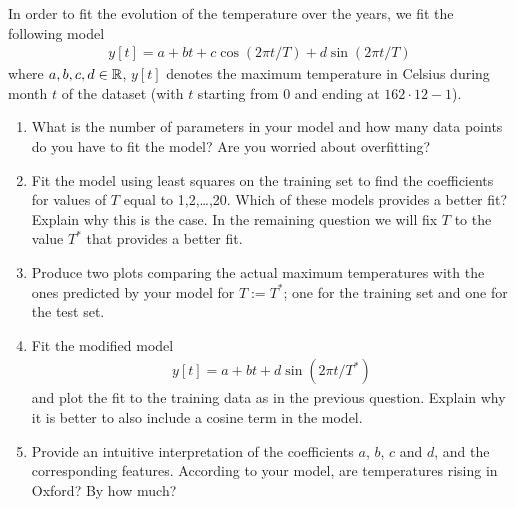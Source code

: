 \documentclass[12pt,twoside]{article}
\begin{document}
\begin{enumerate}
 In order to fit the evolution of the temperature over the years, we fit the following model
  \begin{align}
  y[t] = a + bt + c \cos(2\pi t/T) + d\sin(2\pi  t/T)
  \end{align}
  where $a,b,c,d\in\mathbb{R}$, $y[t]$ denotes the maximum temperature in Celsius during month $t$ of the dataset (with $t$ starting from $0$ and ending at $162\cdot 12-1$).
   
  \begin{enumerate}
  \item What is the number of parameters in your model and how many data points do you have to fit the model? Are you worried about overfitting?
  \item Fit the model using least squares on the training set to
    find the coefficients for values of $T$ equal to 1,2,\ldots,20. Which of these models provides a better fit? Explain why this is the case. In the remaining question we will fix $T$ to the value $T^{\ast}$ that provides a better fit.
  \item Produce two plots comparing the actual maximum temperatures with
    the ones predicted by your model for $T:=T^{\ast}$; one for the training set and one for the test set. 
 \item Fit the modified model  
   \begin{align}
  y[t] = a + bt + d \sin(2\pi t/T^{\ast})
  \end{align}
and plot the fit to the training data as in the previous question. Explain why it is better to also include a cosine term in the model.
   \item Provide an intuitive interpretation of the coefficients $a$, $b$, $c$ and $d$, and the corresponding features. According to your model, are temperatures rising in Oxford? By how much?
  \end{enumerate}
   

\end{enumerate}
\end{document}
